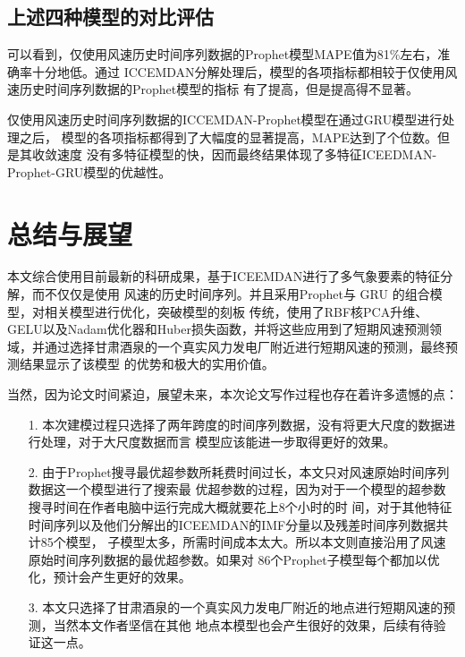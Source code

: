 \documentclass[AutoFakeBold]{LZUThesis}
\begin{document}
\section{上述四种模型的对比评估}

可以看到，仅使用风速历史时间序列数据的Prophet模型MAPE值为81\%左右，准确率十分地低。通过
ICCEMDAN分解处理后，模型的各项指标都相较于仅使用风速历史时间序列数据的Prophet模型的指标
有了提高，但是提高得不显著。

仅使用风速历史时间序列数据的ICCEMDAN-Prophet模型在通过GRU模型进行处理之后，
模型的各项指标都得到了大幅度的显著提高，MAPE达到了个位数。但是其收敛速度
没有多特征模型的快，因而最终结果体现了多特征ICEEDMAN-Prophet-GRU模型的优越性。

\chapter{总结与展望}

本文综合使用目前最新的科研成果，基于ICEEMDAN进行了多气象要素的特征分解，而不仅仅是使用
风速的历史时间序列。并且采用Prophet与 GRU 的组合模型，对相关模型进行优化，突破模型的刻板
传统，使用了RBF核PCA升维、GELU以及Nadam优化器和Huber损失函数，并将这些应用到了短期风速预测领
域，并通过选择甘肃酒泉的一个真实风力发电厂附近进行短期风速的预测，最终预测结果显示了该模型
的优势和极大的实用价值。

当然，因为论文时间紧迫，展望未来，本次论文写作过程也存在着许多遗憾的点：

\begin{itemize}
\item[1.] 本次建模过程只选择了两年跨度的时间序列数据，没有将更大尺度的数据进行处理，对于大尺度数据而言
模型应该能进一步取得更好的效果。
\item[2.] 由于Prophet搜寻最优超参数所耗费时间过长，本文只对风速原始时间序列数据这一个模型进行了搜索最
优超参数的过程，因为对于一个模型的超参数搜寻时间在作者电脑中运行完成大概就要花上8个小时的时
间，对于其他特征时间序列以及他们分解出的ICEEMDAN的IMF分量以及残差时间序列数据共计85个模型，
子模型太多，所需时间成本太大。所以本文则直接沿用了风速原始时间序列数据的最优超参数。如果对
86个Prophet子模型每个都加以优化，预计会产生更好的效果。
\item[3.] 本文只选择了甘肃酒泉的一个真实风力发电厂附近的地点进行短期风速的预测，当然本文作者坚信在其他
地点本模型也会产生很好的效果，后续有待验证这一点。
\end{itemize}

\backmatter


\printbib
\end{document}
